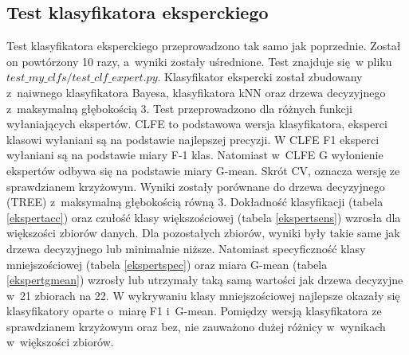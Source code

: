 \subsection{Test klasyfikatora eksperckiego}
Test klasyfikatora eksperckiego przeprowadzono tak samo jak poprzednie. Został on powtórzony 10 razy, a~wyniki zostały uśrednione. Test znajduje się w pliku $test\_my\_clfs/test\_clf\_expert.py$. Klasyfikator ekspercki został zbudowany z~naiwnego klasyfikatora Bayesa, klasyfikatora kNN oraz drzewa decyzyjnego z~maksymalną głębokością 3. Test przeprowadzono dla różnych funkcji wyłaniających ekspertów. CLFE to podstawowa wersja klasyfikatora, eksperci klasowi wyłaniani są na podstawie najlepszej precyzji. W CLFE F1 eksperci wyłaniani są na podstawie miary F-1 klas. Natomiast w~CLFE G wyłonienie ekspertów odbywa się na podstawie miary G-mean. Skrót CV, oznacza wersję ze sprawdzianem krzyżowym. Wyniki zostały porównane do drzewa decyzyjnego (TREE) z~maksymalną głębokością równą 3. Dokładność klasyfikacji (tabela \ref{ekspertacc}) oraz czułość klasy większościowej (tabela \ref{ekspertsens}) wzrosła dla większości zbiorów danych. Dla pozostałych zbiorów, wyniki były takie same jak drzewa decyzyjnego lub minimalnie niższe. Natomiast specyficzność klasy mniejszościowej (tabela \ref{ekspertspec}) oraz miara G-mean (tabela \ref{ekspertgmean}) wzrosły lub utrzymały taką samą wartości jak drzewa decyzyjne w~21 zbiorach na 22. W wykrywaniu klasy mniejszościowej najlepsze okazały się klasyfikatory oparte o~miarę F1 i~G-mean. Pomiędzy wersją klasyfikatora ze sprawdzianem krzyżowym oraz bez, nie zauważono dużej różnicy w~wynikach w~większości zbiorów.

